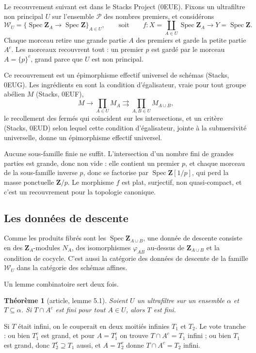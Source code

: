\documentclass[11pt,a4paper]{amsart}
\theoremstyle{definition}
\theoremstyle{plain}
\newtheorem{theoreme}{Théorème}
\theoremstyle{remark}
\newcommand{\Z}{\mathbf Z}
\newcommand{\Pp}{\mathcal P}
\newcommand{\Spec}{\operatorname{Spec}}
\begin{document}
Le recouvrement suivant est dans le Stacks Project (0EUE). Fixons un ultrafiltre non principal $U$ sur l'ensemble $\Pp$ des nombres premiers, et considérons
\[
\mathcal W_U=\{\Spec\Z_A\to\Spec\Z\}_{A\in U},\qquad\text{soit}\qquad f\colon X=\coprod_{A\in U}\Spec\Z_A\to Y=\Spec\Z .
\]
Chaque morceau retire une grande partie $A$ des premiers et garde la petite partie $A^c$. Les morceaux recouvrent tout : un premier $p$ est gardé par le morceau $A=\{p\}^c$, grand parce que $U$ est non principal.

Ce recouvrement est un épimorphisme effectif universel de schémas (Stacks, 0EUG). Les ingrédients en sont la condition d'égalisateur, vraie pour tout groupe abélien $M$ (Stacks, 0EUF),
\[
M\to\prod_{A\in U}M_A\rightrightarrows\prod_{A,B\in U}M_{A\cup B},
\]
le recollement des fermés qui coïncident sur les intersections, et un critère (Stacks, 0EUD) selon lequel cette condition d'égalisateur, jointe à la submersivité universelle, donne un épimorphisme effectif universel.

Aucune sous-famille finie ne suffit. L'intersection d'un nombre fini de grandes parties est grande, donc non vide : elle contient un premier $p$, et chaque morceau de la sous-famille inverse $p$, donc se factorise par $\Spec\Z[1/p]$, qui perd la masse ponctuelle $\Z/p$. Le morphisme $f$ est plat, surjectif, non quasi-compact, et c'est un recouvrement pour la topologie canonique.

\subsection{Les données de descente}

Comme les produits fibrés sont les $\Spec\Z_{A\cup B}$, une donnée de descente consiste en des $\Z_A$-modules $N_A$, des isomorphismes $\varphi_{AB}$ au-dessus de $\Z_{A\cup B}$ et la condition de cocycle. C'est aussi la catégorie des données de descente de la famille $\mathcal W_U$ dans la catégorie des schémas affines.

Un lemme combinatoire sert deux fois.

\begin{theoreme}[article, lemme 5.1]
Soient $U$ un ultrafiltre sur un ensemble $\alpha$ et $T\subseteq\alpha$. Si $T\cap A^c$ est fini pour tout $A\in U$, alors $T$ est fini.
\end{theoreme}

Si $T$ était infini, on le couperait en deux moitiés infinies $T_1$ et $T_2$. Le vote tranche : ou bien $T_1^c$ est grand, et pour $A=T_1^c$ on trouve $T\cap A^c=T_1$ infini ; ou bien $T_1$ est grand, donc $T_2^c\supseteq T_1$ aussi, et $A=T_2^c$ donne $T\cap A^c=T_2$ infini.
\end{document}
